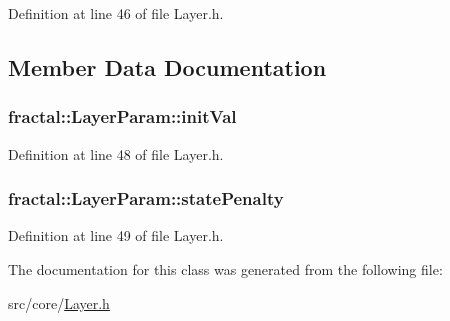 Definition at line 46 of file Layer.\+h.



\subsection{Member Data Documentation}
\hypertarget{classfractal_1_1LayerParam_aae6edad72d27d1cf21edf34620d59a4d}{
\subsubsection[{init\+Val}]{ fractal\+::\+Layer\+Param\+::init\+Val}}\label{classfractal_1_1LayerParam_aae6edad72d27d1cf21edf34620d59a4d}


Definition at line 48 of file Layer.\+h.

\hypertarget{classfractal_1_1LayerParam_a1742fd1a80deb366a7157a643cbf27c6}{
\subsubsection[{state\+Penalty}]{ fractal\+::\+Layer\+Param\+::state\+Penalty}}\label{classfractal_1_1LayerParam_a1742fd1a80deb366a7157a643cbf27c6}


Definition at line 49 of file Layer.\+h.



The documentation for this class was generated from the following file\+:\begin{DoxyCompactItemize}
\item 
src/core/\hyperlink{Layer_8h}{Layer.\+h}\end{DoxyCompactItemize}
